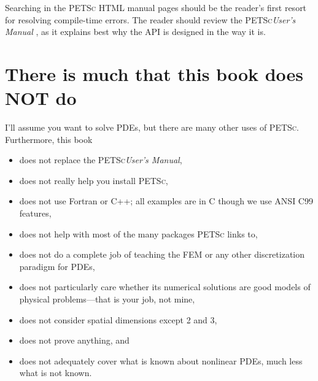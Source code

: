 \documentclass{tufte-book}
\theoremstyle{definition}
\newcommand{\PETSc}{\textsc{PETSc}\xspace}
\begin{document}
Searching in the \PETSc HTML manual pages should be the reader's first resort for resolving compile-time errors.  The reader should review the \PETSc \emph{User's Manual} \citep{petsc-user-ref}, as it explains best why the API is designed in the way it is.


\section{There is much that this book does NOT do}

I'll assume you want to solve PDEs, but there are many other uses of \PETSc.  Furthermore, this book\begin{itemize}
\item  does not replace the \PETSc \emph{User's Manual},
\item  does not really help you install \PETSc,
\item  does not use Fortran or C++; all examples are in C though we use ANSI C99 features,
\item  does not help with most of the many packages \PETSc links to,
\item  does not do a complete job of teaching the FEM or any other discretization paradigm for PDEs,
\item  does not particularly care whether its numerical solutions are good models of physical problems---that is your job, not mine,
\item  does not consider spatial dimensions except 2 and 3,
\item  does not prove anything, and
\item  does not adequately cover what is known about nonlinear PDEs, much less what is not known.
\end{itemize}


\mainmatter









\end{document}
